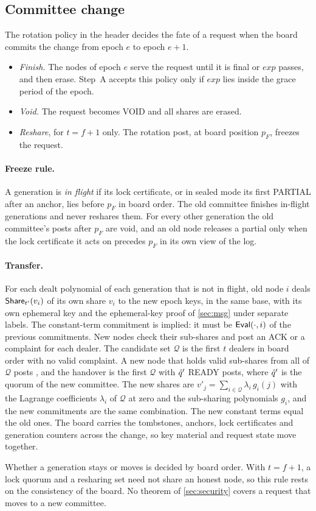\subsection{Committee change}\label{sec:rotation}

The rotation policy in the header decides the fate of a request when the board commits the change from epoch $e$ to epoch $e+1$.

\begin{itemize}[leftmargin=1.5em]
\item \emph{Finish.} The nodes of epoch $e$ serve the request until it is final or $exp$ passes, and then erase. Step~A accepts this policy only if $exp$ lies inside the grace period of the epoch.
\item \emph{Void.} The request becomes \textsf{VOID} and all shares are erased.
\item \emph{Reshare}, for $t = f+1$ only. The rotation post, at board position $p_F$, freezes the request.
\end{itemize}

\paragraph{Freeze rule.} A generation is \emph{in flight} if its lock certificate, or in sealed mode its first PARTIAL after an anchor, lies before $p_F$ in board order. The old committee finishes in-flight generations and never reshares them. For every other generation the old committee's posts after $p_F$ are void, and an old node releases a partial only when the lock certificate it acts on precedes $p_F$ in its own view of the log.

\paragraph{Transfer.} For each dealt polynomial of each generation that is not in flight, old node $i$ deals $\mathsf{Share}_{t'}(v_i)$ of its own share $v_i$ to the new epoch keys, in the same base, with its own ephemeral key and the ephemeral-key proof of \cref{sec:msg} under separate labels. The constant-term commitment is implied: it must be $\mathsf{Eval}(\cdot, i)$ of the previous commitments. New nodes check their sub-shares and post an ACK or a complaint for each dealer. The candidate set $\mathcal{Q}$ is the first $t$ dealers in board order with no valid complaint. A new node that holds valid sub-shares from all of $\mathcal{Q}$ posts , and the handover is the first $\mathcal{Q}$ with $\hat{q}'$ READY posts, where $\hat{q}'$ is the quorum of the new committee. The new shares are $v'_j = \sum_{i \in \mathcal{Q}} \lambda_i\, g_i(j)$ with the Lagrange coefficients $\lambda_i$ of $\mathcal{Q}$ at zero and the sub-sharing polynomials $g_i$, and the new commitments are the same combination. The new constant terms equal the old ones. The board carries the tombstones, anchors, lock certificates and generation counters across the change, so key material and request state move together.

Whether a generation stays or moves is decided by board order. With $t = f+1$, a lock quorum and a resharing set need not share an honest node, so this rule rests on the consistency of the board. No theorem of \cref{sec:security} covers a request that moves to a new committee.
